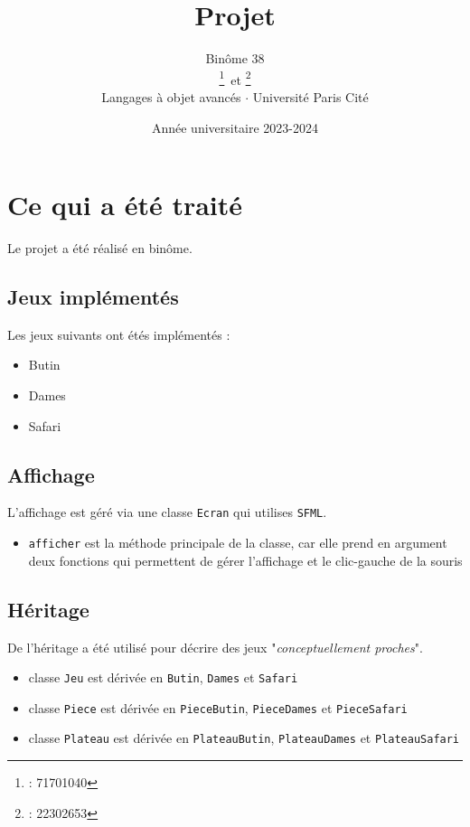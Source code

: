 \documentclass{article}
\title{\settitle}
\title{Projet}
\author{Binôme 38 \\
        \emma\thanks{\emma : 71701040}\, et \anri\thanks{\anri : 22302653} \\
        Langages à objet avancés $\cdot$ Université Paris Cité}
\date{Année universitaire 2023-2024}
\begin{document}
\maketitle
\tableofcontents
\clearpage

\newcommand{\separator}{\vspace{1em}}

\section{Ce qui a été traité}
Le projet a été réalisé en binôme.

\subsection{Jeux implémentés}
Les jeux suivants ont étés implémentés :
\begin{itemize}
  \item Butin
  \item Dames
  \item Safari
\end{itemize}

\subsection{Affichage}
L'affichage est géré via une classe \texttt{Ecran} qui utilises \texttt{SFML}.
\begin{itemize}
  \item \texttt{afficher} est la méthode principale de la classe, car elle prend
        en argument deux fonctions qui permettent de gérer l'affichage et le
        clic-gauche de la souris
\end{itemize}

\subsection{Héritage}
De l'héritage a été utilisé pour décrire des jeux "\textit{conceptuellement
  proches}".
\begin{itemize}
  \item classe \texttt{Jeu} est dérivée en \texttt{Butin}, \texttt{Dames} et
        \texttt{Safari}
  \item classe \texttt{Piece} est dérivée en \texttt{PieceButin},
        \texttt{PieceDames} et \texttt{PieceSafari}
  \item classe \texttt{Plateau} est dérivée en \texttt{PlateauButin},
        \texttt{PlateauDames} et \texttt{PlateauSafari}
\end{itemize}
\end{document}
